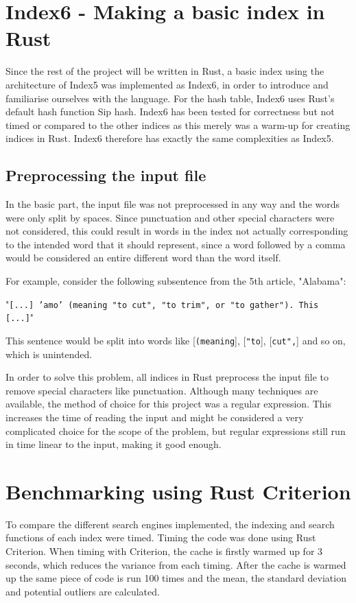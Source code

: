 \section{Index6 - Making a basic index in Rust}
Since the rest of the project will be written in Rust, a basic index using the architecture of Index5 was implemented as Index6, in order to introduce and familiarise ourselves with the language. For the hash table, Index6 uses Rust's default hash function Sip hash\cite{Siphash}. Index6 has been tested for correctness but not timed or compared to the other indices as this merely was a warm-up for creating indices in Rust. Index6 therefore has exactly the same complexities as Index5. 

\subsection{Preprocessing the input file}

In the basic part, the input file was not preprocessed in any way and the words were only split by spaces. Since punctuation and other special characters were not considered, this could result in words in the index not actually corresponding to the intended word that it should represent, since a word followed by a comma would be considered an entire different word than the word itself. 

\newpage
For example, consider the following subsentence from the 5th article, "Alabama":

\begin{center}
    "\texttt{[...] 'amo' (meaning "to cut", "to trim", or "to gather"). This [...]}"
\end{center}

This sentence would be split into words like [\texttt{(meaning}], [\texttt{"to}], [\texttt{cut",}] and so on, which is unintended. 

In order to solve this problem, all indices in Rust preprocess the input file to remove special characters like punctuation. Although many techniques are available, the method of choice for this project was a regular expression. This increases the time of reading the input and might be considered a very complicated choice for the scope of the problem, but regular expressions still run in time linear to the input, making it good enough. 

\section{Benchmarking using Rust Criterion}
To compare the different search engines implemented, the indexing and search functions of each index were timed. Timing the code was done using Rust Criterion. When timing with Criterion, the cache is firstly warmed up for 3 seconds, which reduces the variance from each timing. After the cache is warmed up the same piece of code is run 100 times and the mean, the standard deviation and potential outliers are calculated.


